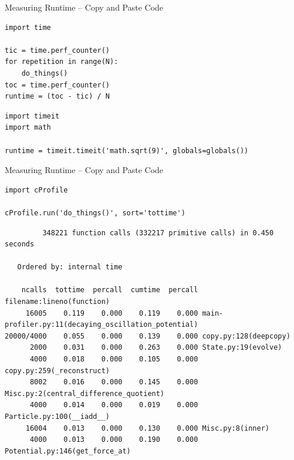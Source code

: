 \begin{frame}[fragile]{Measuring Runtime -- Copy and Paste Code}
%
\begin{codebox}
\begin{verbatim}
import time

tic = time.perf_counter()
for repetition in range(N):
    do_things()
toc = time.perf_counter()
runtime = (toc - tic) / N
\end{verbatim}
\end{codebox}
%
\begin{codebox}
\begin{verbatim}
import timeit
import math

runtime = timeit.timeit('math.sqrt(9)', globals=globals())
\end{verbatim}
\end{codebox}
%
\end{frame}


\begin{frame}[fragile]{Measuring Runtime -- Copy and Paste Code}
%
\begin{codebox}
\begin{verbatim}
import cProfile

cProfile.run('do_things()', sort='tottime')
\end{verbatim}
\end{codebox}
%
\begin{cmdbox}
\begin{verbatim}
         348221 function calls (332217 primitive calls) in 0.450 seconds

   Ordered by: internal time

    ncalls  tottime  percall  cumtime  percall filename:lineno(function)
     16005    0.119    0.000    0.119    0.000 main-profiler.py:11(decaying_oscillation_potential)
20000/4000    0.055    0.000    0.139    0.000 copy.py:128(deepcopy)
      2000    0.031    0.000    0.263    0.000 State.py:19(evolve)
      4000    0.018    0.000    0.105    0.000 copy.py:259(_reconstruct)
      8002    0.016    0.000    0.145    0.000 Misc.py:2(central_difference_quotient)
      4000    0.014    0.000    0.019    0.000 Particle.py:100(__iadd__)
     16004    0.013    0.000    0.130    0.000 Misc.py:8(inner)
      4000    0.013    0.000    0.190    0.000 Potential.py:146(get_force_at)
\end{verbatim}
\end{cmdbox}
%
\end{frame}

